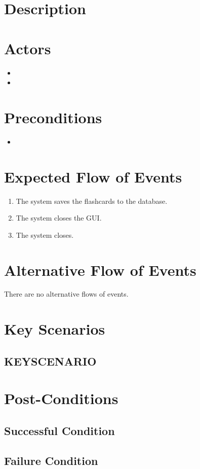 \documentclass{scrreprt}
\begin{document}
\section{Description}

\section{Actors}
\begin{itemize}
    \item 
    \item 
\end{itemize}

\section{Preconditions}
\begin{itemize}
    \item 
\end{itemize}

\section{Expected Flow of Events}
    \begin{enumerate}[1.]
        \item The system saves the flashcards to the database.
        \item The system closes the GUI.
        \item The system closes.
    \end{enumerate}

\section{Alternative Flow of Events}
    There are no alternative flows of events.

\section{Key Scenarios}
    \subsection{KEYSCENARIO}

\section{Post-Conditions}
    \subsection{Successful Condition}
    
    \subsection{Failure Condition}
\end{document}
